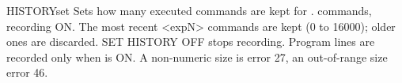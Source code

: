 \begin{XbaseEntry}{HISTORY}{set}
Sets how many executed commands are kept for .
\Syntax
{}
 commands, recording ON.
\Usage
The most recent <expN> commands are kept (0 to 16000); older ones are
discarded.  SET HISTORY OFF stops recording.  Program lines are recorded only
when  is ON.  A non-numeric size is error 27, an
out-of-range size error 46.
\end{XbaseEntry}
